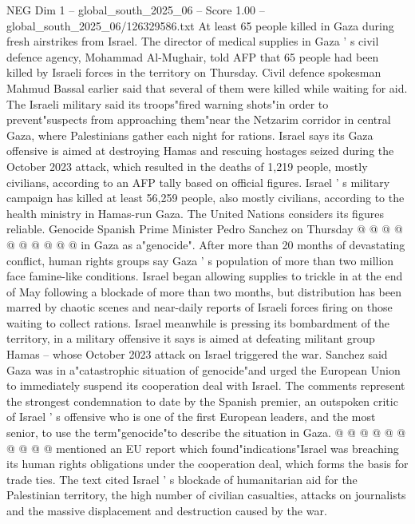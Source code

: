 \begin{textsample}{NEG Dim 1 – global\_south\_2025\_06 – Score 1.00 – global\_south\_2025\_06/126329586.txt}  \label{ex:f1_neg_241}
At least 65 people killed in Gaza during fresh airstrikes from Israel.
The director of medical supplies in Gaza ' s civil defence agency, Mohammad Al-Mughair, told AFP that 65 people had been killed by Israeli forces in the territory on Thursday.
Civil defence spokesman Mahmud Bassal earlier said that several of them were killed while waiting for aid.
The Israeli military said its troops"fired warning shots"in order to prevent"suspects from approaching them"near the Netzarim corridor in central Gaza, where Palestinians gather each night for rations.
Israel says its Gaza offensive is aimed at destroying Hamas and rescuing hostages seized during the October 2023 attack, which resulted in the deaths of 1,219 people, mostly civilians, according to an AFP tally based on official figures.
Israel ' s military campaign has killed at least 56,259 people, also mostly civilians, according to the health ministry in Hamas-run Gaza.
The United Nations considers its figures reliable.
Genocide Spanish Prime Minister Pedro Sanchez on Thursday @ @ @ @ @ @ @ @ @ @ in Gaza as a"genocide".
After more than 20 months of devastating conflict, human rights groups say Gaza ' s population of more than two million face famine-like conditions.
Israel began allowing supplies to trickle in at the end of May following a blockade of more than two months, but distribution has been marred by chaotic scenes and near-daily reports of Israeli forces firing on those waiting to collect rations.
Israel meanwhile is pressing its bombardment of the territory, in a military offensive it says is aimed at defeating militant group Hamas -- whose October 2023 attack on Israel triggered the war.
Sanchez said Gaza was in a"catastrophic situation of genocide"and urged the European Union to immediately suspend its cooperation deal with Israel.
The comments represent the strongest condemnation to date by the Spanish premier, an outspoken critic of Israel ' s offensive who is one of the first European leaders, and the most senior, to use the term"genocide"to describe the situation in Gaza. @ @ @ @ @ @ @ @ @ @ mentioned an EU report which found"indications"Israel was breaching its human rights obligations under the cooperation deal, which forms the basis for trade ties.
The text cited Israel ' s blockade of humanitarian aid for the Palestinian territory, the high number of civilian casualties, attacks on journalists and the massive displacement and destruction caused by the war.

\end{textsample}
